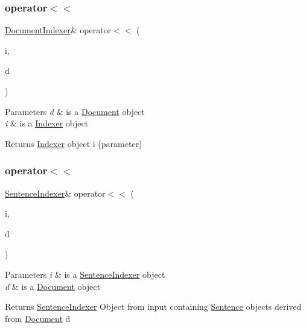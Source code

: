 \subsubsection{\texorpdfstring{operator$<$$<$}{operator<<}\hspace{0.1cm}{\footnotesize\ttfamily [2/4]}}
{\footnotesize\ttfamily \hyperlink{class_document_indexer}{Document\+Indexer}\& operator$<$$<$ (\begin{DoxyParamCaption}\item[{\hyperlink{class_document_indexer}{Document\+Indexer} \&}]{i,  }\item[{const \hyperlink{class_document}{Document} \&}]{d }\end{DoxyParamCaption})\hspace{0.3cm}{\ttfamily [friend]}}


\begin{DoxyParams}{Parameters}
{\em d} & is a \hyperlink{class_document}{Document} object \\
\hline
{\em i} & is a \hyperlink{class_indexer}{Indexer} object \\
\hline
\end{DoxyParams}
\begin{DoxyReturn}{Returns}
\hyperlink{class_indexer}{Indexer} object i (parameter) 
\end{DoxyReturn}
\mbox{\label{class_document_a30be5b0aa936deff7dc8763b554083ef}} 
\subsubsection{\texorpdfstring{operator$<$$<$}{operator<<}\hspace{0.1cm}{\footnotesize\ttfamily [3/4]}}
{\footnotesize\ttfamily \hyperlink{class_sentence_indexer}{Sentence\+Indexer}\& operator$<$$<$ (\begin{DoxyParamCaption}\item[{\hyperlink{class_sentence_indexer}{Sentence\+Indexer} \&}]{i,  }\item[{const \hyperlink{class_document}{Document} \&}]{d }\end{DoxyParamCaption})\hspace{0.3cm}{\ttfamily [friend]}}


\begin{DoxyParams}{Parameters}
{\em i} & is a \hyperlink{class_sentence_indexer}{Sentence\+Indexer} object \\
\hline
{\em d} & is a \hyperlink{class_document}{Document} object \\
\hline
\end{DoxyParams}
\begin{DoxyReturn}{Returns}
\hyperlink{class_sentence_indexer}{Sentence\+Indexer} Object from input containing \hyperlink{class_sentence}{Sentence} objects derived from \hyperlink{class_document}{Document} d 
\end{DoxyReturn}
\mbox{\label{class_document_aa87204fbda2f471a4c7a4499d97c8c27}} 
